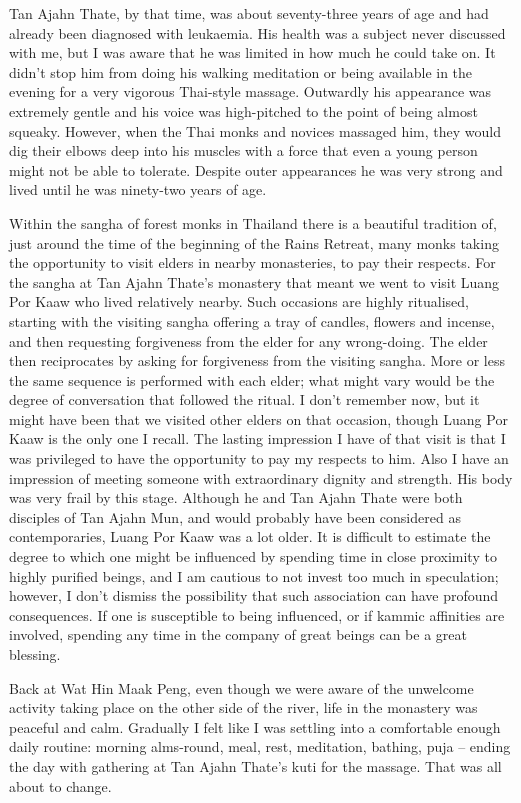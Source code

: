 Tan Ajahn Thate, by that time, was about seventy-three years of age and
had already been diagnosed with leukaemia. His health was a subject
never discussed with me, but I was aware that he was limited in how much
he could take on. It didn't stop him from doing his walking meditation
or being available in the evening for a very vigorous Thai-style
massage. Outwardly his appearance was extremely gentle and his voice was
high-pitched to the point of being almost squeaky. However, when the
Thai monks and novices massaged him, they would dig their elbows deep
into his muscles with a force that even a young person might not be able
to tolerate. Despite outer appearances he was very strong and lived
until he was ninety-two years of age\cite{thate}.

Within the sangha of forest monks in Thailand there is a beautiful
tradition of, just around the time of the beginning of the Rains
Retreat, many monks taking the opportunity to visit elders in nearby
monasteries, to pay their respects. For the sangha at Tan Ajahn Thate's
monastery that meant we went to visit Luang Por Kaaw who lived
relatively nearby. Such occasions are highly ritualised, starting with
the visiting sangha offering a tray of candles, flowers and incense, and
then requesting forgiveness from the elder for any wrong-doing. The elder
then reciprocates by asking for forgiveness from the visiting sangha.
More or less the same sequence is performed with each elder; what might
vary would be the degree of conversation that followed the ritual. I
don't remember now, but it might have been that we visited other elders
on that occasion, though Luang Por Kaaw is the only one I recall. The
lasting impression I have of that visit is that I was privileged to have
the opportunity to pay my respects to him. Also I have an impression of
meeting someone with extraordinary dignity and strength. His body was
very frail by this stage. Although he and Tan Ajahn Thate were both
disciples of Tan Ajahn Mun, and would probably have been considered as
contemporaries, Luang Por Kaaw was a lot older. It is difficult to
estimate the degree to which one might be influenced by spending time in
close proximity to highly purified beings, and I am cautious to not
invest too much in speculation; however, I don't dismiss the possibility
that such association can have profound consequences. If one is
susceptible to being influenced, or if kammic affinities are involved,
spending any time in the company of great beings can be a great
blessing.

Back at Wat Hin Maak Peng, even though we were aware of the unwelcome
activity taking place on the other side of the river, life in the
monastery was peaceful and calm. Gradually I felt like I was settling
into a comfortable enough daily routine: morning alms-round, meal, rest,
meditation, bathing, puja -- ending the day with gathering at Tan Ajahn
Thate's kuti for the massage. That was all about to change.


